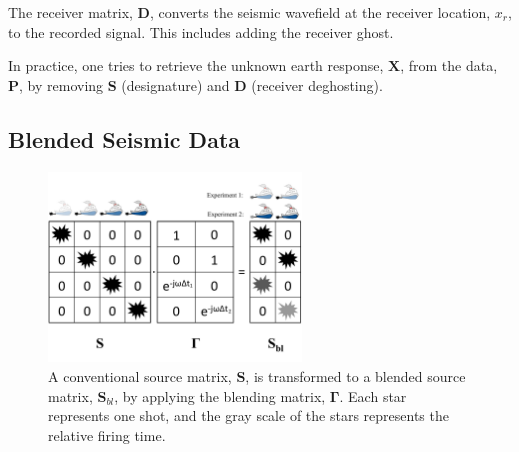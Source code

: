 The receiver matrix, $\mathbf{D}$, converts the seismic wavefield at the receiver location, $x_r$, to the recorded signal. This includes adding the receiver ghost.

In practice, one tries to retrieve the unknown earth response, $\mathbf{X}$, from the data, $\mathbf{P}$, by removing $\mathbf{S}$ (designature) and $\mathbf{D}$ (receiver deghosting).



\subsection{Blended Seismic Data}

\begin{figure}
	
	\centering
	\includegraphics[width=0.6\textwidth]{Plots/Blended-Source-edit2}
	\caption{A conventional source matrix, $\mathbf{S}$, is transformed to a blended source matrix, $\mathbf{S}_{bl}$, by applying the blending matrix, $\mathbf{\Gamma}$. Each star represents one shot, and the gray scale of the stars represents the relative firing time.}
	\label{fig:Ch-Theory-BlendedSource}
\end{figure}


